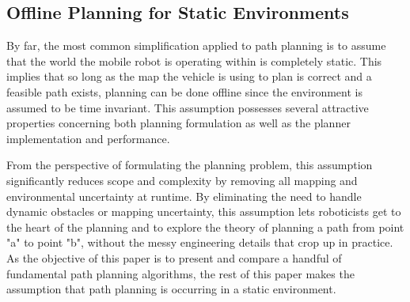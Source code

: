 \subsection{Offline Planning for Static Environments}

By far, the most common simplification applied to path planning is to assume that the world the mobile robot is operating within is completely static. This implies that so long as the map the vehicle is using to plan is correct and a feasible path exists, planning can be done offline since the environment is assumed to be time invariant. This assumption possesses several attractive properties concerning both planning formulation as well as the planner implementation and performance.

From the perspective of formulating the planning problem, this assumption significantly reduces scope and complexity by removing all mapping and environmental uncertainty at runtime. By eliminating the need to handle dynamic obstacles or mapping uncertainty, this assumption lets roboticists get to the heart of the planning and to explore the theory of planning a path from point "a" to point "b", without the messy engineering details that crop up in practice. As the objective of this paper is to present and compare a handful of fundamental path planning algorithms, the rest of this paper makes the assumption that path planning is occurring in a static environment.